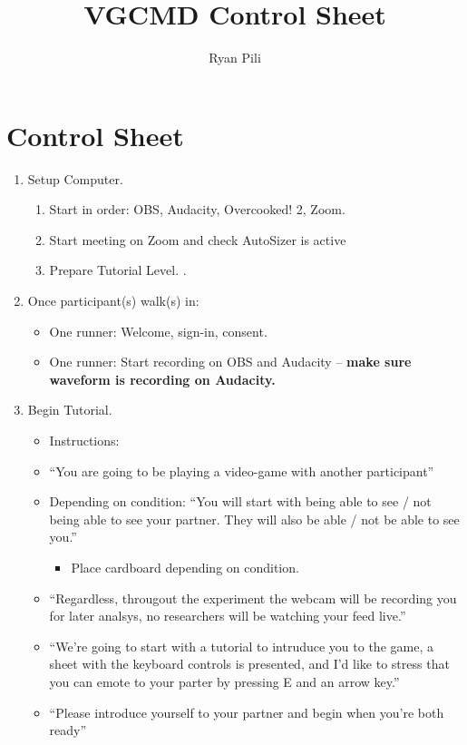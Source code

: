 \documentclass[11pt,twoside,letterpaper]{article}
\title{VGCMD Control Sheet}
\author{Ryan Pili}
\begin{document}
\maketitle

\section*{Control Sheet}
\flushleft
\begin{enumerate}
	\item Setup Computer.
		\begin{enumerate}
			\item Start in order: OBS, Audacity, Overcooked! 2, Zoom.
			\item Start meeting on Zoom and check AutoSizer is active
			\item Prepare Tutorial Level. .
		\end{enumerate}
	\item Once participant(s) walk(s) in: 
			\begin{itemize}
				\item One runner: Welcome, sign-in, consent.
				\item One runner: Start recording on OBS and Audacity -- \textbf{make sure waveform is recording on Audacity.}
			\end{itemize}
	\item Begin Tutorial.
		\begin{itemize}
			\item Instructions:
			\item ``You are going to be playing a video-game with another participant'' 
			\item Depending on condition: ``You will start with being able to see / not being able to see your partner. They will also be able / not be able to see you.''
				\begin{itemize}
					\item Place cardboard depending on condition.
				\end{itemize}
			\item ``Regardless, througout the experiment the webcam will be recording you for later analsys, no researchers will be watching your feed live.''
			\item ``We're going to start with a tutorial to intruduce you to the game, a sheet with the keyboard controls is presented, and I'd like to stress that you can emote to your parter by pressing E and an arrow key.''
			\item ``Please introduce yourself to your partner and begin when you're both ready''

\end{itemize}
\end{enumerate}
\end{document}
